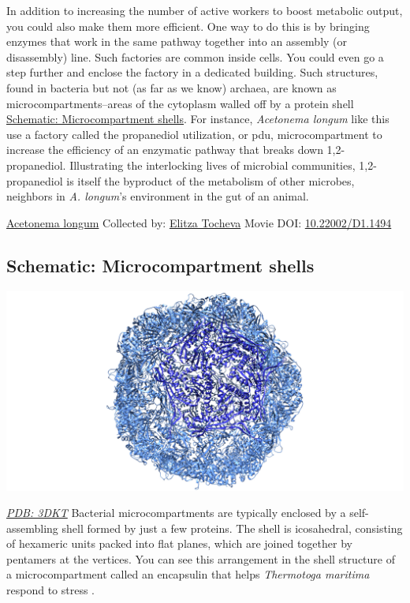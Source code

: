 \documentclass[]{tufte-book}
\begin{document}
In addition to increasing the number of active workers to boost metabolic output, you could also make them more efficient. One way to do this is by bringing enzymes that work in the same pathway together into an assembly (or disassembly) line. Such factories are common inside cells. You could even go a step further and enclose the factory in a dedicated building. Such structures, found in bacteria but not (as far as we know) archaea, are known as microcompartments--areas of the cytoplasm walled off by a protein shell \protect\hyperlink{Microcompartment_shells}{Schematic: Microcompartment shells}. For instance, \emph{Acetonema longum} like this use a factory called the propanediol utilization, or pdu, microcompartment to increase the efficiency of an enzymatic pathway that breaks down 1,2-propanediol. Illustrating the interlocking lives of microbial communities, 1,2-propanediol is itself the byproduct of the metabolism of other microbes, neighbors in \emph{A. longum}'s environment in the gut of an animal.



\hypertarget{htmlwidget-3977eabb38d364dbc3b8}{}

\label{fig:4-6}\protect\hyperlink{tree}{Acetonema longum} Collected by: \protect\hyperlink{elitza_tocheva}{Elitza Tocheva} Movie DOI: \href{https://doi.org/10.22002/D1.1494}{10.22002/D1.1494}

\hypertarget{Microcompartment_shells}{%
\subsection*{Schematic: Microcompartment shells}\label{Microcompartment_shells}}

\includegraphics{img/schematics/4_6_1}

\href{http://rcsb.org/structure/3DKT}{\emph{PDB: 3DKT}}
Bacterial microcompartments are typically enclosed by a self-assembling shell formed by just a few proteins. The shell is icosahedral, consisting of hexameric units packed into flat planes, which are joined together by pentamers at the vertices. You can see this arrangement in the shell structure of a microcompartment called an encapsulin that helps \emph{Thermotoga maritima} respond to stress \citep{sutter2008}.
\end{document}
